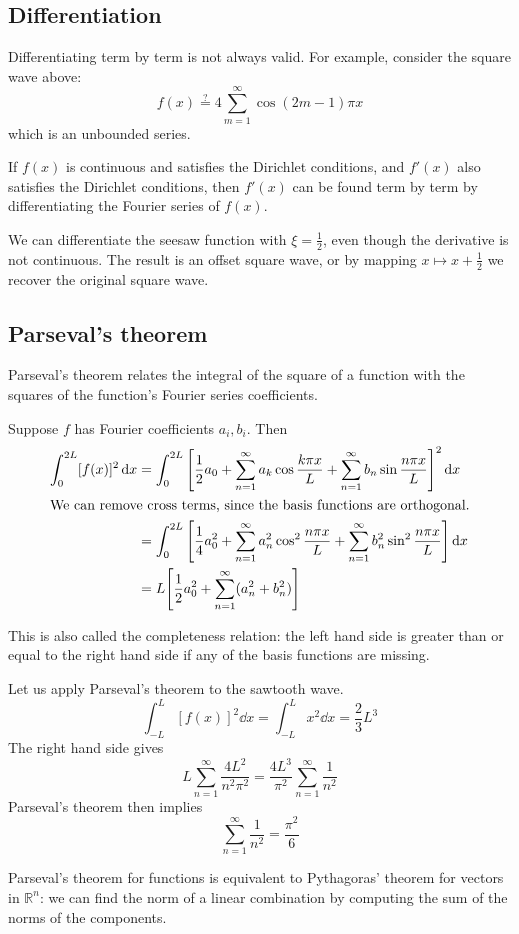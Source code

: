 \subsection{Differentiation}
Differentiating term by term is not always valid.
For example, consider the square wave above:
\[
	f(x) \stackrel{?}{=} 4 \sum_{m=1}^\infty \cos (2m-1)\pi x
\]
which is an unbounded series.
\begin{theorem}
	If \( f(x) \) is continuous and satisfies the Dirichlet conditions, and \( f'(x) \) also satisfies the Dirichlet conditions, then \( f'(x) \) can be found term by term by differentiating the Fourier series of \( f(x) \).
\end{theorem}
\begin{example}
	We can differentiate the seesaw function with \( \xi = \frac{1}{2} \), even though the derivative is not continuous.
	The result is an offset square wave, or by mapping \( x \mapsto x + \frac{1}{2} \) we recover the original square wave.
\end{example}

\subsection{Parseval's theorem}
Parseval's theorem relates the integral of the square of a function with the squares of the function's Fourier series coefficients.
\begin{theorem}
	Suppose \( f \) has Fourier coefficients \( a_i, b_i \).
	Then
	\begin{align*}
		\int_0^{2L} [f(x)]^2 \dd{x} & = \int_0^{2L} \qty[ \frac{1}{2}a_0 + \sum_{n=1}^\infty a_k \cos \frac{k \pi x}{L} + \sum_{n=1}^\infty b_n \sin \frac{n\pi x}{L} ]^2 \dd{x}           \\
		\intertext{We can remove cross terms, since the basis functions are orthogonal.}
		                            & = \int_0^{2L} \qty[ \frac{1}{4} a_0^2 + \sum_{n=1}^\infty a_n^2 \cos^2 \frac{n\pi x}{L} + \sum_{n=1}^\infty b_n^2 \sin^2 \frac{n\pi x}{L} ] \dd{x} \\
		                            & = L \qty[ \frac{1}{2} a_0^2 + \sum_{n=1}^\infty (a_n^2 + b_n^2) ]
	\end{align*}
\end{theorem}
This is also called the completeness relation: the left hand side is greater than or equal to the right hand side if any of the basis functions are missing.
\begin{example}
	Let us apply Parseval's theorem to the sawtooth wave.
	\[
		\int_{-L}^L [f(x)]^2 \dd{x} = \int_{-L}^L x^2 \dd{x} = \frac{2}{3}L^3
	\]
	The right hand side gives
	\[
		L \sum_{n=1}^\infty \frac{4L^2}{n^2 \pi^2} = \frac{4 L^3}{\pi^2} \sum_{n=1}^\infty \frac{1}{n^2}
	\]
	Parseval's theorem then implies
	\[
		\sum_{n=1}^\infty \frac{1}{n^2} = \frac{\pi^2}{6}
	\]
\end{example}
\begin{remark}
	Parseval's theorem for functions is equivalent to Pythagoras' theorem for vectors in \( \mathbb R^n \): we can find the norm of a linear combination by computing the sum of the norms of the components.
\end{remark}

